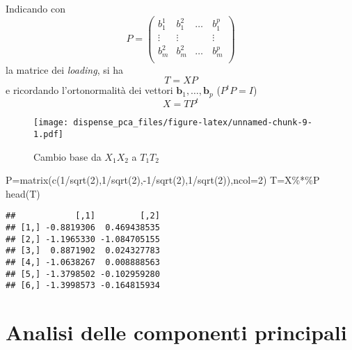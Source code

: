 \documentclass[
  11pt,
]{book}
\newenvironment{Shaded}{\begin{snugshade}}{\end{snugshade}}
\newcommand{\AttributeTok}[1]{\textcolor[rgb]{0.77,0.63,0.00}{#1}}
\newcommand{\DecValTok}[1]{\textcolor[rgb]{0.00,0.00,0.81}{#1}}
\newcommand{\FunctionTok}[1]{\textcolor[rgb]{0.00,0.00,0.00}{#1}}
\newcommand{\NormalTok}[1]{#1}
\newcommand{\OtherTok}[1]{\textcolor[rgb]{0.56,0.35,0.01}{#1}}
\newcommand{\SpecialCharTok}[1]{\textcolor[rgb]{0.00,0.00,0.00}{#1}}
\begin{document}
Indicando con
\begin{equation}
P=
 \left(
 \begin{array}{cccc}
 b^1_1  & b^2_1 & \dots & b^p_1 \\
 \vdots &\vdots & \quad & \vdots \\
 b^2_m & b^2_m & \dots & b^p_m \\
 \end{array}
 \right) 
\end{equation}
la matrice dei \emph{loading}, si ha
\begin{equation}
 T=XP
\end{equation}
e ricordando l'ortonormalità dei vettori \(\textbf{b}_1,\dots,\textbf{b}_p\) (\(P^tP=I\))
\begin{equation}
 X=TP^t
\end{equation}

\begin{figure}
\centering
\texttt{[image: dispense\_pca\_files/figure-latex/unnamed-chunk-9-1.pdf]}
\caption{\label{fig:unnamed-chunk-9}Cambio base da \(X_1X_2\) a \(T_1T_2\) \label{fig:cambiobase}}
\end{figure}

\begin{Shaded}
\begin{Highlighting}[]
\NormalTok{P}\OtherTok{=}\FunctionTok{matrix}\NormalTok{(}\FunctionTok{c}\NormalTok{(}\DecValTok{1}\SpecialCharTok{/}\FunctionTok{sqrt}\NormalTok{(}\DecValTok{2}\NormalTok{),}\DecValTok{1}\SpecialCharTok{/}\FunctionTok{sqrt}\NormalTok{(}\DecValTok{2}\NormalTok{),}\SpecialCharTok{{-}}\DecValTok{1}\SpecialCharTok{/}\FunctionTok{sqrt}\NormalTok{(}\DecValTok{2}\NormalTok{),}\DecValTok{1}\SpecialCharTok{/}\FunctionTok{sqrt}\NormalTok{(}\DecValTok{2}\NormalTok{)),}\AttributeTok{ncol=}\DecValTok{2}\NormalTok{)}
\NormalTok{T}\OtherTok{=}\NormalTok{X}\SpecialCharTok{\%*\%}\NormalTok{P}
\FunctionTok{head}\NormalTok{(T)}
\end{Highlighting}
\end{Shaded}

\begin{verbatim}
##            [,1]         [,2]
## [1,] -0.8819306  0.469438535
## [2,] -1.1965330 -1.084705155
## [3,]  0.8871902  0.024327783
## [4,] -1.0638267  0.008888563
## [5,] -1.3798502 -0.102959280
## [6,] -1.3998573 -0.164815934
\end{verbatim}

\hypertarget{analisi-delle-componenti-principali}{%
\chapter{Analisi delle componenti principali}\label{analisi-delle-componenti-principali}}
\end{document}
